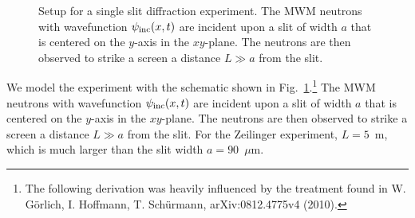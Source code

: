 \begin{figure}
\centering
{}
\caption{Setup for a single slit diffraction experiment.  The MWM neutrons with wavefunction $\psi_{\rm inc}(x,t)$ are incident upon a slit of width $a$ that is centered on the $y$-axis in the $xy$-plane.  The neutrons are then observed to strike a screen a distance $L \gg a$ from the slit.}
\label{single slit setup}
\end{figure}

We model the experiment with the schematic shown in Fig.~\ref{single slit setup}.\footnote{The following derivation was heavily influenced by the treatment found in W. G\"{o}rlich, I. Hoffmann, T. Sch\"{u}rmann, arXiv:0812.4775v4 (2010).} The MWM neutrons with wavefunction $\psi_{\rm inc}(x,t)$ are incident upon a slit of width $a$ that is centered on the $y$-axis in the $xy$-plane.  The neutrons are then observed to strike a screen a distance $L \gg a$ from the slit.  For the Zeilinger experiment, $L = 5$~m, which is much larger than the slit width $a = 90$~$\mu$m.

